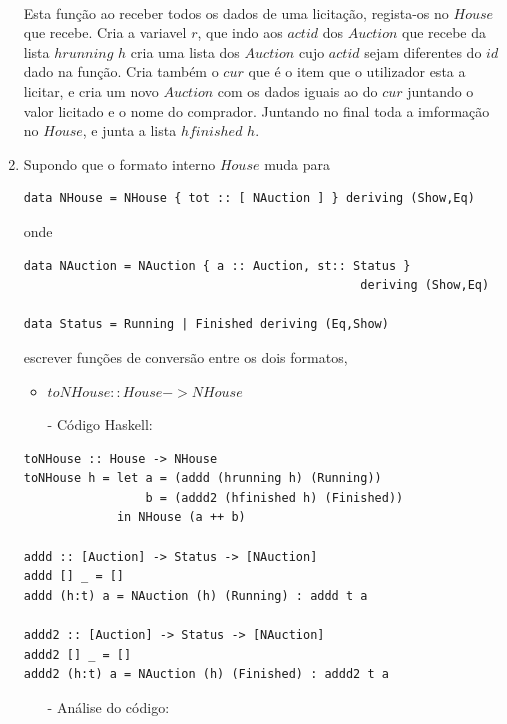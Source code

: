 \documentclass[a4paper]{article}
\begin{document}
\begin{enumerate}
\paragraph{}Esta função ao receber todos os dados de uma licitação, regista-os no $House$ que recebe. Cria a variavel $r$, que indo aos $actid$ dos $Auction$ que recebe da lista $hrunning$ $h$ cria uma lista dos $Auction$ cujo $actid$ sejam diferentes do $id$ dado na função. Cria também o $cur$ que é o item que o utilizador  esta a licitar, e cria um novo $Auction$ com os dados iguais ao do $cur$ juntando o valor licitado e o nome do comprador. Juntando no final toda a imformação no $House$, e junta a lista $hfinished$ $h$.


\item Supondo que o formato interno $House$ muda para
\begin{verbatim}
data NHouse = NHouse { tot :: [ NAuction ] } deriving (Show,Eq)
\end{verbatim}
onde
\begin{verbatim}
data NAuction = NAuction { a :: Auction, st:: Status } 
                                               deriving (Show,Eq)

data Status = Running | Finished deriving (Eq,Show)
\end{verbatim}
escrever funções de conversão entre os dois formatos,

\begin{itemize}
\item $toNHouse :: House -> NHouse$
\item[-]{Código Haskell:}
\end{itemize}
\begin{verbatim}
toNHouse :: House -> NHouse
toNHouse h = let a = (addd (hrunning h) (Running))
                 b = (addd2 (hfinished h) (Finished))
             in NHouse (a ++ b)

addd :: [Auction] -> Status -> [NAuction]
addd [] _ = []
addd (h:t) a = NAuction (h) (Running) : addd t a

addd2 :: [Auction] -> Status -> [NAuction]
addd2 [] _ = []
addd2 (h:t) a = NAuction (h) (Finished) : addd2 t a
\end{verbatim}
\begin{itemize}
\item[-]{Análise do código:}
\end{itemize}

\end{enumerate}
\end{document}
